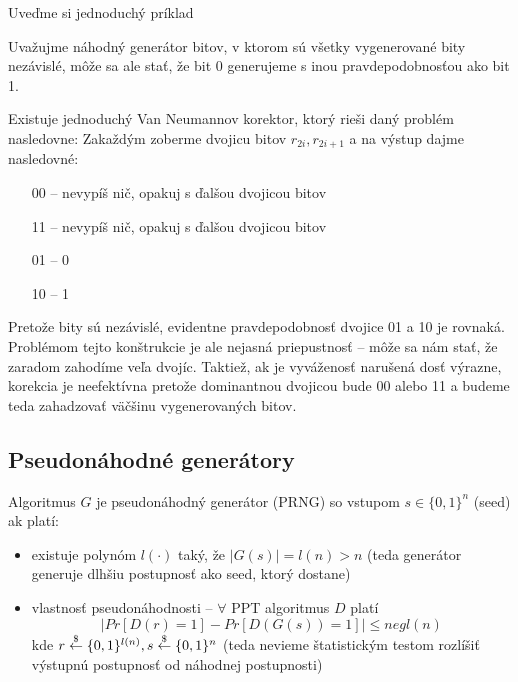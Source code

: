 Uveďme si jednoduchý príklad
\begin{priklad}
  Uvažujme náhodný generátor bitov, v ktorom sú všetky vygenerované bity
  nezávislé, môže sa ale stať, že bit 0 generujeme s inou pravdepodobnosťou
  ako bit 1.

  Existuje jednoduchý Van Neumannov korektor, ktorý rieši
  daný problém nasledovne: Zakaždým zoberme dvojicu bitov $r_{2i},r_{2i+1}$
  a na výstup dajme nasledovné:
  \begin{itemize}
    \item[00] -- nevypíš nič, opakuj s ďalšou dvojicou bitov
    \item[11] -- nevypíš nič, opakuj s ďalšou dvojicou bitov
    \item[01] -- 0
    \item[10] -- 1
  \end{itemize}
  Pretože bity sú nezávislé, evidentne pravdepodobnosť dvojice 01 a 10 je
  rovnaká. Problémom tejto konštrukcie je ale nejasná priepustnosť --
  môže sa nám stať, že zaradom zahodíme veľa dvojíc. Taktiež, ak je
  vyváženosť narušená dosť výrazne, korekcia je neefektívna pretože
  dominantnou dvojicou bude 00 alebo 11 a budeme teda zahadzovať väčšinu
  vygenerovaných bitov.
\end{priklad}

\subsection{Pseudonáhodné generátory}

\begin{definicia}
    Algoritmus $G$ je pseudonáhodný generátor (PRNG) so vstupom 
    $s \in \{0,1\}^n$ (seed) ak platí:
    \begin{itemize}
        \item existuje polynóm $l(\cdot)$ taký, že
            $|G(s)| = l(n) > n$ (teda generátor generuje dlhšiu postupnosť 
            ako seed, ktorý dostane)
        \item vlastnosť pseudonáhodnosti -- $\forall$ PPT
            algoritmus $D$ platí
            \begin{equation*}
                \Big|Pr[D(r) = 1] - Pr[D(G(s)) = 1]\Big| \leq negl(n)
            \end{equation*}
            kde $r \overset{\$}{\leftarrow} \{0,1\}^{l(n)}, s \overset{\$}{\leftarrow} \{0,1\}^n$ 
            (teda nevieme štatistickým testom rozlíšiť výstupnú postupnosť 
            od náhodnej postupnosti)
    \end{itemize}
\end{definicia}

